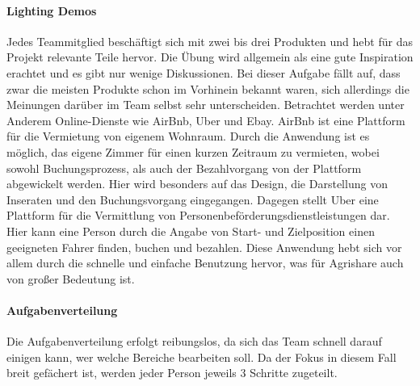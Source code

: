 \paragraph{Lighting Demos}
%
Jedes Teammitglied beschäftigt sich mit zwei bis drei Produkten und hebt für das Projekt relevante Teile hervor. Die Übung wird allgemein als eine gute Inspiration erachtet und es gibt nur wenige Diskussionen. 
Bei dieser Aufgabe fällt auf, dass zwar die meisten Produkte schon im Vorhinein bekannt waren, sich allerdings die Meinungen darüber im Team selbst sehr unterscheiden. Betrachtet werden unter Anderem Online-Dienste wie AirBnb, Uber und Ebay. AirBnb ist eine Plattform für die Vermietung von eigenem Wohnraum. Durch die Anwendung ist es möglich, das eigene Zimmer für einen kurzen Zeitraum zu vermieten, wobei sowohl Buchungsprozess, als auch der Bezahlvorgang von der Plattform abgewickelt werden. Hier wird besonders auf das Design, die Darstellung von Inseraten und den Buchungsvorgang eingegangen. Dagegen stellt Uber eine Plattform für die Vermittlung von Personenbeförderungsdienstleistungen dar. Hier kann eine Person durch die Angabe von Start- und Zielposition einen geeigneten Fahrer finden, buchen und bezahlen. Diese Anwendung hebt sich vor allem durch die schnelle und einfache Benutzung hervor, was für Agrishare auch von großer Bedeutung ist.

\paragraph{Aufgabenverteilung}
Die Aufgabenverteilung erfolgt reibungslos, da sich das Team schnell darauf einigen kann, wer welche Bereiche bearbeiten soll. Da der Fokus in diesem Fall breit gefächert ist, werden jeder Person jeweils 3 Schritte zugeteilt.

